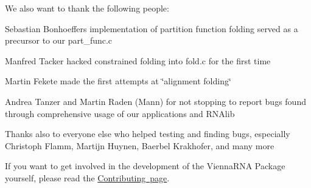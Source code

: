 We also want to thank the following people\+:


\begin{DoxyItemize}
\item Sebastian Bonhoeffer\textquotesingle{}s implementation of partition function folding served as a precursor to our part\+\_\+func.\+c
\item Manfred Tacker hacked constrained folding into fold.\+c for the first time
\item Martin Fekete made the first attempts at \char`\"{}alignment folding\char`\"{}
\item Andrea Tanzer and Martin Raden (Mann) for not stopping to report bugs found through comprehensive usage of our applications and R\+N\+Alib
\item Thanks also to everyone else who helped testing and finding bugs, especially Christoph Flamm, Martijn Huynen, Baerbel Krakhofer, and many more 
\end{DoxyItemize}

If you want to get involved in the development of the Vienna\+R\+NA Package yourself, please read the \mbox{\hyperlink{md_CONTRIBUTING}{Contributing page}}.

 